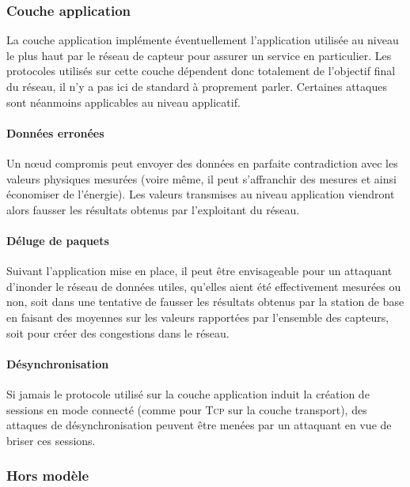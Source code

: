     \subsubsection{Couche application}
La couche application implémente éventuellement l'application utilisée au niveau le plus haut par le réseau de capteur pour assurer un service en particulier.
Les protocoles utilisés sur cette couche dépendent donc totalement de l'objectif final du réseau, il n'y a pas ici de standard à proprement parler.
Certaines attaques sont néanmoins applicables au niveau applicatif.

        \paragraph{Données erronées}
Un nœud compromis peut envoyer des données en parfaite contradiction avec les valeurs physiques mesurées (voire même, il peut s'affranchir des mesures et ainsi économiser de l'énergie).
Les valeurs transmises au niveau application viendront alors fausser les résultats obtenus par l'exploitant du réseau.

        \paragraph{Déluge de paquets}
Suivant l'application mise en place, il peut être envisageable pour un attaquant d'inonder le réseau de données utiles, qu'elles aient été effectivement mesurées ou non, soit dans une tentative de fausser les résultats obtenus par la station de base en faisant des moyennes sur les valeurs rapportées par l'ensemble des capteurs, soit pour créer des congestions dans le réseau.

        \paragraph{Désynchronisation}
Si jamais le protocole utilisé sur la couche application induit la création de sessions en mode connecté (comme pour \textsc{Tcp} sur la couche transport), des attaques de désynchronisation peuvent être menées par un attaquant en vue de briser ces sessions.

    \subsubsection{Hors modèle}
